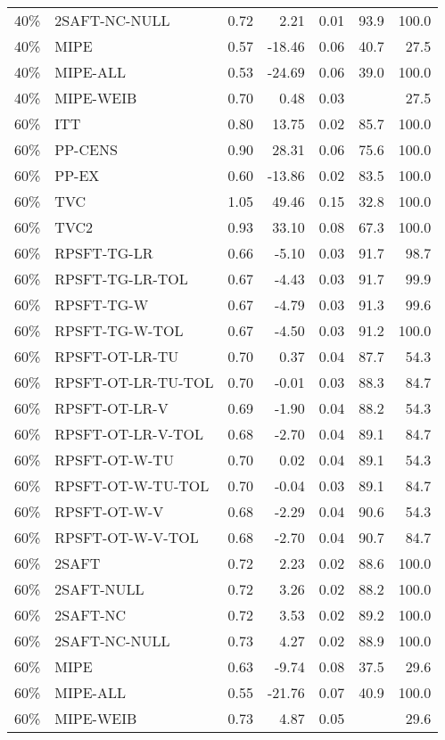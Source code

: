 \begin{table}[ht]
{\begin{tabular}{llrrrrr}
  40\% & 2SAFT-NC-NULL & 0.72 & 2.21 & 0.01 & 93.9 & 100.0 \\ 
  40\% & MIPE & 0.57 & -18.46 & 0.06 & 40.7 & 27.5 \\ 
  40\% & MIPE-ALL & 0.53 & -24.69 & 0.06 & 39.0 & 100.0 \\ 
  40\% & MIPE-WEIB & 0.70 & 0.48 & 0.03 &  & 27.5 \\ 
   \hline
60\% & ITT & 0.80 & 13.75 & 0.02 & 85.7 & 100.0 \\ 
  60\% & PP-CENS & 0.90 & 28.31 & 0.06 & 75.6 & 100.0 \\ 
  60\% & PP-EX & 0.60 & -13.86 & 0.02 & 83.5 & 100.0 \\ 
  60\% & TVC & 1.05 & 49.46 & 0.15 & 32.8 & 100.0 \\ 
  60\% & TVC2 & 0.93 & 33.10 & 0.08 & 67.3 & 100.0 \\ 
   \hline
60\% & RPSFT-TG-LR & 0.66 & -5.10 & 0.03 & 91.7 & 98.7 \\ 
  60\% & RPSFT-TG-LR-TOL & 0.67 & -4.43 & 0.03 & 91.7 & 99.9 \\ 
  60\% & RPSFT-TG-W & 0.67 & -4.79 & 0.03 & 91.3 & 99.6 \\ 
  60\% & RPSFT-TG-W-TOL & 0.67 & -4.50 & 0.03 & 91.2 & 100.0 \\ 
  60\% & RPSFT-OT-LR-TU & 0.70 & 0.37 & 0.04 & 87.7 & 54.3 \\ 
  60\% & RPSFT-OT-LR-TU-TOL & 0.70 & -0.01 & 0.03 & 88.3 & 84.7 \\ 
  60\% & RPSFT-OT-LR-V & 0.69 & -1.90 & 0.04 & 88.2 & 54.3 \\ 
  60\% & RPSFT-OT-LR-V-TOL & 0.68 & -2.70 & 0.04 & 89.1 & 84.7 \\ 
   \hline
60\% & RPSFT-OT-W-TU & 0.70 & 0.02 & 0.04 & 89.1 & 54.3 \\ 
  60\% & RPSFT-OT-W-TU-TOL & 0.70 & -0.04 & 0.03 & 89.1 & 84.7 \\ 
  60\% & RPSFT-OT-W-V & 0.68 & -2.29 & 0.04 & 90.6 & 54.3 \\ 
  60\% & RPSFT-OT-W-V-TOL & 0.68 & -2.70 & 0.04 & 90.7 & 84.7 \\ 
   \hline
60\% & 2SAFT & 0.72 & 2.23 & 0.02 & 88.6 & 100.0 \\ 
  60\% & 2SAFT-NULL & 0.72 & 3.26 & 0.02 & 88.2 & 100.0 \\ 
  60\% & 2SAFT-NC & 0.72 & 3.53 & 0.02 & 89.2 & 100.0 \\ 
  60\% & 2SAFT-NC-NULL & 0.73 & 4.27 & 0.02 & 88.9 & 100.0 \\ 
  60\% & MIPE & 0.63 & -9.74 & 0.08 & 37.5 & 29.6 \\ 
  60\% & MIPE-ALL & 0.55 & -21.76 & 0.07 & 40.9 & 100.0 \\ 
  60\% & MIPE-WEIB & 0.73 & 4.87 & 0.05 &  & 29.6 \\ 
   \hline
\end{tabular}
}
\end{table}
